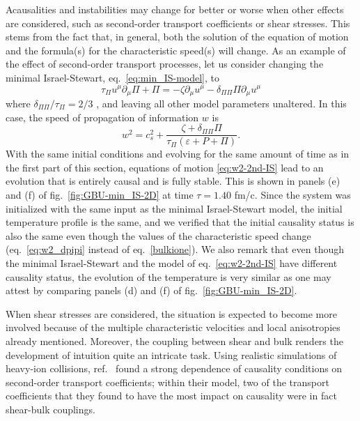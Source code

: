 \documentclass[aps, prd, showkeys,superscriptaddress, nofootinbib,floatfix]{revtex4-2}
\begin{document}
Acausalities and instabilities may change for better or worse when other effects are considered, such as second-order transport coefficients or shear stresses. This stems from the fact that, in general, both the solution of the equation of motion and the formula(s) for the characteristic speed(s) will change. As an example of the effect of second-order transport processes, let us consider changing the minimal Israel-Stewart, eq.~\eqref{eq:min_IS-model}, to 
\begin{equation}
\label{eq:w2-2nd-IS}
\tau_\Pi u^\mu \partial_\mu\Pi + \Pi = -\zeta\partial_\mu u^\mu - \delta_{\Pi \Pi} \Pi \partial_\mu u^\mu  
\end{equation}
%
where $\delta_{\Pi \Pi}/\tau_{\Pi} = 2/3$ \cite{Denicol:2014vaa}, and leaving all other model parameters unaltered. In this case, the speed of propagation of information $w$ is
%
\begin{equation}
w^{2} = c_s^2 +\dfrac{\zeta + \delta_{\Pi \Pi} \Pi}{\tau_\Pi (\varepsilon{+}P{+}\Pi)}.   
\label{eq:w2_dpipi}
\end{equation}
%
With the same initial conditions and evolving for the same amount of time as in the first part of this section, equations of motion \eqref{eq:w2-2nd-IS} lead to an evolution that is entirely causal and is fully stable. This is shown in panels (e) and (f) of fig.~\ref{fig:GBU-min_IS-2D} at time $\tau = 1.40$ fm/c. Since the system was initialized with the same input as the minimal Israel-Stewart model, the initial temperature profile is the same, and we verified that the initial causality status is also the same even though the values of the characteristic speed change (eq.~\eqref{eq:w2_dpipi} instead of eq.~\eqref{bulkione}). We also remark that even though the minimal Israel-Stewart and the model of eq.~\eqref{eq:w2-2nd-IS} have different causality status, the evolution of the temperature is very similar as one may attest by comparing panels (d) and (f) of fig.~\ref{fig:GBU-min_IS-2D}. 

When shear stresses are considered, the situation is expected to become more involved because of the multiple characteristic velocities and local anisotropies already mentioned. Moreover, the coupling between shear and bulk renders the development of intuition quite an intricate task. Using realistic simulations of heavy-ion collisions, ref.~\cite{Chiu:2021muk} found a strong dependence of causality conditions on second-order transport coefficients; within their model, two of the transport coefficients that they found to have the most impact on causality were in fact shear-bulk couplings.
\end{document}
